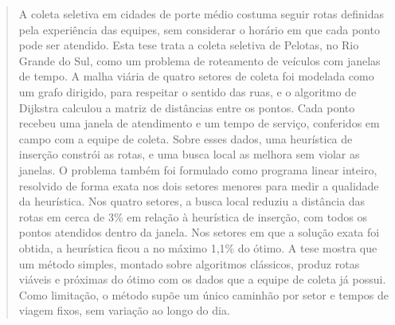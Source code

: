 \documentclass[tese,capa]{texufpel}
\begin{document}
\begin{abstract}
A coleta seletiva em cidades de porte médio costuma seguir rotas definidas
pela experiência das equipes, sem considerar o horário em que cada ponto pode
ser atendido. Esta tese trata a coleta seletiva de Pelotas, no Rio Grande do
Sul, como um problema de roteamento de veículos com janelas de tempo. A malha
viária de quatro setores de coleta foi modelada como um grafo dirigido, para
respeitar o sentido das ruas, e o algoritmo de Dijkstra calculou a matriz de
distâncias entre os pontos. Cada ponto recebeu uma janela de atendimento e um
tempo de serviço, conferidos em campo com a equipe de coleta. Sobre esses
dados, uma heurística de inserção constrói as rotas, e uma busca local as
melhora sem violar as janelas. O problema também foi formulado como programa
linear inteiro, resolvido de forma exata nos dois setores menores para medir
a qualidade da heurística. Nos quatro setores, a busca local reduziu a
distância das rotas em cerca de 3\% em relação à heurística de inserção, com
todos os pontos atendidos dentro da janela. Nos setores em que a solução
exata foi obtida, a heurística ficou a no máximo 1,1\% do ótimo. A tese mostra
que um método simples, montado sobre algoritmos clássicos, produz rotas
viáveis e próximas do ótimo com os dados que a equipe de coleta já possui.
Como limitação, o método supõe um único caminhão por setor e tempos de viagem
fixos, sem variação ao longo do dia.
\end{abstract}
\end{document}
